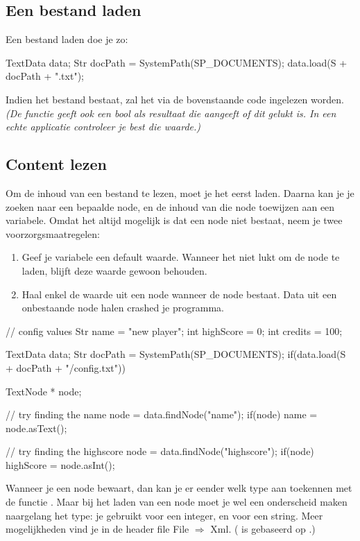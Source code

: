 \subsection{Een bestand laden}
Een bestand laden doe je zo:

\begin{code}
TextData data;
Str docPath = SystemPath(SP_DOCUMENTS);
data.load(S + docPath + "\config.txt");
\end{code}

Indien het bestand bestaat, zal het via de bovenstaande code ingelezen worden. \textsl{(De functie  geeft ook een bool als resultaat die aangeeft of dit gelukt is. In een echte applicatie controleer je best die waarde.)}

\subsection{Content lezen}
Om de inhoud van een bestand te lezen, moet je het eerst laden. Daarna kan je je zoeken naar een bepaalde node, en de inhoud van die node toewijzen aan een variabele. Omdat het altijd mogelijk is dat een node niet bestaat, neem je twee voorzorgsmaatregelen:

\begin{enumerate}
	\item Geef je variabele een default waarde. Wanneer het niet lukt om de node te laden, blijft deze waarde gewoon behouden.
	\item Haal enkel de waarde uit een node wanneer de node bestaat. Data uit een onbestaande node halen crashed je programma.
\end{enumerate}

\begin{code}
// config values
Str name = "new player";
int highScore = 0;
int credits = 100;

TextData data;
Str docPath = SystemPath(SP_DOCUMENTS);
if(data.load(S + docPath + "/config.txt")) {
   TextNode * node;
	 
	 // try finding the name
	 node = data.findNode("name");
	 if(node) {
	    name = node.asText();
	 }
	 
	 // try finding the highscore
	 node = data.findNode("highscore");
	 if(node) {
	    highScore = node.asInt();
	 }
}
\end{code}

\begin{note}
Wanneer je een node bewaart, dan kan je er eender welk type aan toekennen met de functie . Maar bij het laden van een node moet je wel een onderscheid maken naargelang het type: je gebruikt  voor een integer, en  voor een string. Meer mogelijkheden vind je in de header file File $\Rightarrow$ Xml. ( is gebaseerd op .)
\end{note}

